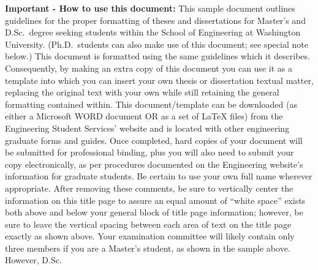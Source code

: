 %


\begin{thesistitlepage}               %
\begin{singlespace}
\tiny
{\small \textbf{Important - How to use this document:}}
This sample document outlines guidelines for the proper formatting of theses
and dissertations for Master's and D.Sc.\ degree seeking students within the
School of Engineering at Washington University.  (Ph.D.\ students can also make
use of this document; see special note below.)  This document is formatted
using the same guidelines which it describes.  Consequently, by making an extra
copy of this document you can use it as a template into which you can insert
your own thesis or dissertation textual matter, replacing the original text
with your own while still retaining the general formatting contained within.
This document/template can be downloaded (as either a Microsoft WORD document
OR as a set of \LaTeX{} files) from the Engineering Student Services' website
and is located with other engineering graduate forms and guides.  Once
completed, hard copies of your document will be submitted for professional
binding, plus you will also need to submit your copy electronically, as per
procedures documented on the Engineering website's information for graduate
students.  Be certain to use your own full name wherever appropriate.  After
removing these comments, be sure to vertically center the information on this
title page to assure an equal amount of ``white space'' exists both above and
below your general block of title page information; however, be sure to leave
the vertical spacing between each area of text on the title page exactly as
shown above.  Your examination committee will likely contain only three members
if you are a Master's student, as shown in the sample above.  However, D.Sc.\

\end{singlespace}
\end{thesistitlepage}

